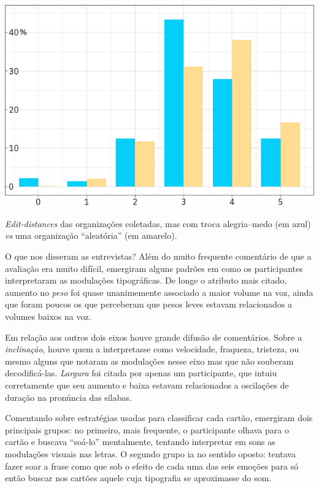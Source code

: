 \documentclass[a4paper]{tufte-handout}
\begin{document}
\begin{marginfigure}
  \includegraphics{imgs/edit_distance_troca.png}
  \caption{\textit{Edit-distances} das organizações coletadas, mas com troca alegria--medo (em azul) \textit{vs} uma organização ``aleatória'' (em amarelo).}
  \label{edit_dist_2}
\end{marginfigure}

O que nos disseram as entrevistas? Além do muito frequente comentário de que a avaliação era muito difícil, emergiram alguns padrões em como os participantes interpretaram as modulações tipográficas. De longe o atributo mais citado, aumento no \textit{peso} foi quase unanimemente associado a maior volume na voz, ainda que foram poucos os que perceberam que pesos leves estavam relacionados a volumes baixos na voz.

Em relação aos outros dois eixos houve grande difusão de comentários. Sobre a \textit{inclinação}, houve quem a interpretasse como velocidade, fraqueza, tristeza, ou mesmo alguns que notaram as modulações nesse eixo mas que não souberam decodificá-las. \textit{Largura} foi citada por apenas um participante, que intuiu corretamente que seu aumento e baixa estavam relacionados a oscilações de duração na pronúncia das sílabas.

Comentando sobre estratégias usadas para classificar cada cartão, emergiram dois principais grupos: no primeiro, mais frequente, o participante olhava para o cartão e buscava ``soá-lo'' mentalmente, tentando interpretar em sons as modulações visuais nas letras. O segundo grupo ia no sentido oposto: tentava fazer soar a frase como que sob o efeito de cada uma das seis emoções para só então buscar nos cartões aquele cuja tipografia se aproximasse do som.
\end{document}
